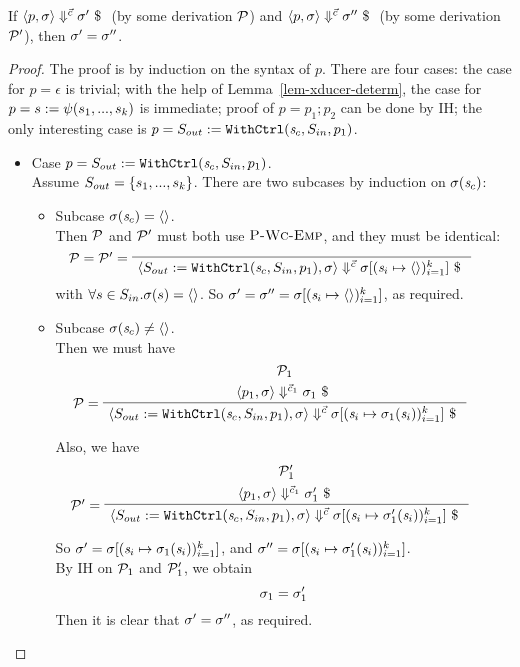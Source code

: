 \begin{thm} \label{thm-svcode-determ}
	If $\seval{p}{\sgm}{\c}{\sgm'}$ (by some derivation $\mathcal{P}$) and $\seval{p}{\sgm}{\c}{\sgm''}$ (by some derivation $\mathcal{P}'$), 
	then $\sigma' = \sigma''$.
\end{thm}

\begin{proof}
	The proof is by induction on the syntax of $p$. There are four cases: the case for $p = \epsilon$ is trivial; with the help of Lemma~\ref{lem-xducer-determ}, the case for $p = s := \psi(s_1,...,s_k)$ is immediate; proof of $p = p_1; p_2$ can be done by IH; the only interesting case is $p = S_{out} := \mathtt{WithCtrl}(\mathit{s}_c,S_{in},p_1)$.
	\begin{itemize}
		\item Case $p = S_{out} := \mathtt{WithCtrl}(\mathit{s}_c,S_{in},p_1)$. \\
		Assume $S_{out} = \{s_1,...,s_k\}$. There are two subcases by induction on $\sigma(\mathit{s}_c)$: 
		\begin{itemize}
			\item Subcase $\sigma(\mathit{s}_c) = \langle \rangle$. \\
			Then $\mathcal{P}$ and $\mathcal{P}'$ must both use $\textsc{P-Wc-Emp}$, and they must be identical:		
			$$\PT{ 
				\LeLa{\MP= \MP' =}
				\Axiom{\seval{\withctrl{\s_c}{p_1}{\Sin}{\Sout}}{\sgm}{\c}{\sgm[\k{\s_i \|-> \emptyv}]}}
			}$$
			with $ \forall s \in S_{in}. \sigma(s) = \langle \rangle$.
			So $\sgm' = \sgm'' = \sgm[\k{\s_i \|-> \emptyv}]$, as required. 
			
			\item Subcase $\sigma(\mathit{s}_c) \neq \langle \rangle$. \\
			Then we must have
			$$\PT{
				\UCN{\MP_1}{\seval{p_1}{\sgm}{\c_1}{\sgm_1}}
				\LeLa{\MP = }
				\UC{\seval{\withctrl{\s_c}{p_1}{\Sin}{\Sout}}{\sgm}{\c}{\sgm[\k{\s_i \|-> \sgm_1(\s_i)}]}}
			}$$
			
			Also, we have
			$$\PT{
				\UCN{\MP'_1}{\seval{p_1}{\sgm}{\c_1}{\sgm'_1}}
				\LeLa{\MP' = }
				\UC{\seval{\withctrl{\s_c}{p_1}{\Sin}{\Sout}}{\sgm}{\c}{\sgm[\k{\s_i \|-> \sgm'_1(\s_i)}]}}
			}$$
			
			So $\sgm' = \sgm[\k{\s_i \|-> \sgm_1(\s_i)}]$, 
			and $\sgm'' = \sgm[\k{\s_i \|-> \sgm'_1(\s_i)}]$. \\
			By IH on $\mathcal{P}_1$ and $\mathcal{P}'_1$, we obtain
			$$\sigma_1 = \sigma_1'$$
			Then it is clear that $\sigma' = \sigma''$, as required.
			
		\end{itemize} 
		
	\end{itemize}
	
\end{proof}




